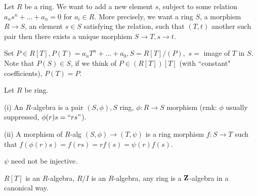 Let $R$ be a ring. We want to add a new element $s$, subject to some relation $a_ns^n+\ldots+a_n=0$ for $a_i\in R$. More precisely, we want a ring $S$, a morphism $R\longrightarrow S$, an element $s\in S$ satisfying the relation, such that $(T,t)$ another such pair then there exists a unique morphism $S\longrightarrow T,s\longrightarrow t$.

Set $P\in R[T], P(T)=a_nT^n+\ldots+a_0, S=R[T]/(P),$ $s=$ image of $T$ in $S$. Note that $P(S)\in S$, if we think of $P\in (R[T])[T]$ (with ``constant" coefficients), $P(T)=P.$
\begin{defn}
Let $R$ be ring.

(i) An $R$-algebra is a pair $(S,\phi), S$ ring, $\phi:R\longrightarrow S$ morphism (rmk: $\phi$ usually suppressed, $\phi(r)s=``rs"$).

(ii) A morphism of $R$-alg $(S,\phi)\longrightarrow (T,\psi)$ is a ring morphism $f:S\longrightarrow T$ such that $f(\phi(r)s)=f(rs)=rf(s)=\psi(r)f(s)$.
\end{defn}
\begin{rmk}
$\psi$ need not be injective.
\end{rmk}
\begin{ex}
$R[T]$ is an $R$-algebra, $R/I$ is an $R$-algebra, any ring is a $\bold{Z}$-algebra in a canonical way.
\end{ex}
